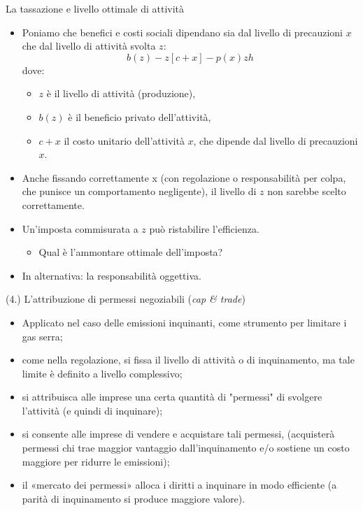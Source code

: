 \documentclass[aspectratio=64,11pt]{beamer}
\begin{document}
\begin{frame}{La tassazione e livello ottimale di attività}
\begin{itemize}
\item Poniamo che benefici e costi sociali dipendano sia dal livello di
precauzioni $x$ che dal livello di attività svolta $z$:
\begin{equation*}
b(z) - z[c+x] - p(x)zh
\end{equation*}
dove:
\begin{itemize}
\item $z$ è il livello di attività (produzione),
\item $b(z)$ è il beneficio privato dell'attività,
\item $c + x$ il costo unitario dell’attività $x$, che dipende dal livello di
precauzioni $x$.
\end{itemize}
\item Anche fissando correttamente x (con regolazione o responsabilità per colpa,
che punisce un comportamento negligente), il livello di $z$ non sarebbe scelto
correttamente.
\item Un'imposta commisurata a $z$ può ristabilire l’efficienza.
\begin{itemize}
\item Qual è l’ammontare ottimale dell’imposta?
\end{itemize}
\item In alternativa: la responsabilità oggettiva.
\end{itemize}
\end{frame}

\begin{frame}{(4.) L'attribuzione di permessi negoziabili (\emph{cap \& trade})}
\begin{itemize}
\item Applicato nel caso delle emissioni inquinanti, come strumento per limitare i gas serra;
\item come nella regolazione, si fissa il livello di attività o di inquinamento, ma tale limite è definito a livello complessivo;
\item si attribuisca alle imprese una certa quantità di "permessi" di svolgere l'attività (e quindi di inquinare);
\item si consente alle imprese di vendere e acquistare tali permessi, (acquisterà permessi chi trae maggior vantaggio dall'inquinamento e/o sostiene un costo maggiore per ridurre le emissioni);
\item il «mercato dei permessi» alloca i diritti a inquinare in modo efficiente (a parità di inquinamento si produce maggiore valore).
\end{itemize}
\end{frame}
\end{document}
